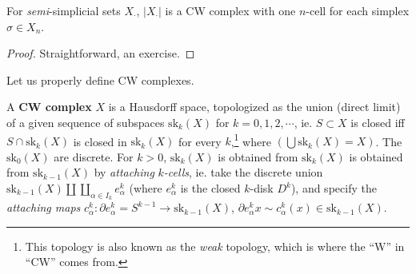 \begin{prop}
    For \emph{semi}-simplicial sets $X_{\cdot }$, $|X_{\cdot }|$ is a CW complex with one $n$-cell for each simplex $\sigma \in X_n $.
\end{prop}
\begin{proof}
    Straightforward, an exercise.
\end{proof}
Let us properly define CW complexes.
\begin{definition}[CW Complex]
    A \textbf{CW complex} $X$ is a Hausdorff space, topologized as the union (direct limit) of a given sequence of subspaces $\mathrm{sk}_k(X)$ for $k=0,1,2,\cdots $, ie. $S \subset X$ is closed iff $S \cap \mathrm{sk}_k(X)$ is closed in $\mathrm{sk}_k(X)$ for every $k$,\footnote{This topology is also known as the \emph{weak} topology, which is where the ``W'' in ``CW'' comes from.} where $\left( \bigcup   \mathrm{sk}_k(X) =X\right) $. The $\mathrm{sk}_0(X)$ are discrete. For $k>0$, $\mathrm{sk}_k(X)$ is obtained from $\mathrm{sk}_k(X)$ is obtained from $\mathrm{sk}_{k-1}(X)$ by \emph{attaching} $k$\emph{-cells}, ie. take the discrete union $\mathrm{sk}_{k-1}(X) \amalg \coprod _{\alpha \in I_k}e_{\alpha }^k$ (where $e_{\alpha }^k$ is the closed $k$-disk $D^k$), and specify the \emph{attaching maps} $c_{\alpha }^k \colon \partial  e_{\alpha }^k=S^{k-1} \to \mathrm{sk}_{k-1}(X)$, $\partial e_{\alpha }^k x \sim c_{\alpha }^k(x) \in \mathrm{sk}_{k-1}(X)$.
\end{definition}

